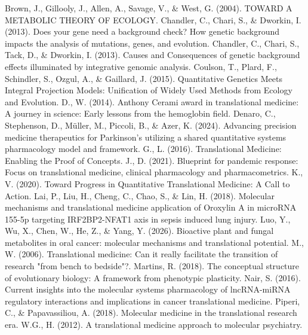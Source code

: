 
 Brown, J., Gillooly, J., Allen, A., Savage, V., \& West, G. (2004). TOWARD A METABOLIC THEORY OF ECOLOGY.
 Chandler, C., Chari, S., \& Dworkin, I. (2013). Does your gene need a background check? How genetic background impacts the analysis of mutations, genes, and evolution.
 Chandler, C., Chari, S., Tack, D., \& Dworkin, I. (2013). Causes and Consequences of genetic background effects illuminated by integrative genomic analysis.
 Coulson, T., Plard, F., Schindler, S., Ozgul, A., \& Gaillard, J. (2015). Quantitative Genetics Meets Integral Projection Models: Unification of Widely Used Methods from Ecology and Evolution.
 D., W. (2014). Anthony Cerami award in translational medicine: A journey in science: Early lessons from the hemoglobin field.
 Denaro, C., Stephenson, D., Müller, M., Piccoli, B., \& Azer, K. (2024). Advancing precision medicine therapeutics for Parkinson’s utilizing a shared quantitative systems pharmacology model and framework.
 G., L. (2016). Translational Medicine: Enabling the Proof of Concepts.
 J., D. (2021). Blueprint for pandemic response: Focus on translational medicine, clinical pharmacology and pharmacometrics.
 K., V. (2020). Toward Progress in Quantitative Translational Medicine: A Call to Action.
 Lai, P., Liu, H., Cheng, C., Chao, S., \& Lin, H. (2018). Molecular mechanisms and translational medicine application of Oroxylin A in microRNA 155-5p targeting IRF2BP2-NFAT1 axis in sepsis induced lung injury.
 Luo, Y., Wu, X., Chen, W., He, Z., \& Yang, Y. (2026). Bioactive plant and fungal metabolites in oral cancer: molecular mechanisms and translational potential.
 M., W. (2006). Translational medicine: Can it really facilitate the transition of research "from bench to bedside"?.
 Martins, R. (2018). The conceptual structure of evolutionary biology: A framework from phenotypic plasticity.
 Nair, S. (2016). Current insights into the molecular systems pharmacology of lncRNA-miRNA regulatory interactions and implications in cancer translational medicine.
 Piperi, C., \& Papavassiliou, A. (2018). Molecular medicine in the translational research era.
 W.G., H. (2012). A translational medicine approach to molecular psychiatry.

